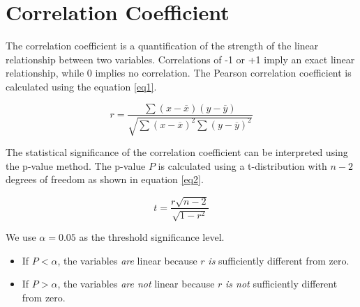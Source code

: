 \documentclass[12pt]{article}
\begin{document}
\section*{Correlation Coefficient}
The correlation coefficient is a quantification of the
strength of the linear relationship between two variables.
Correlations of -1 or +1 imply an exact linear relationship,
while 0 implies no correlation.
The Pearson correlation coefficient is calculated using
the equation \ref{eq1}.

\begin{equation}\label{eq1}
	r = \frac{\sum (x - \overline{x}) (y - \overline{y})}
        {\sqrt{\sum (x - \overline{x})^2 \sum (y - \overline{y})^2}}
\end{equation}

The statistical significance of the correlation coefficient can be
interpreted using the p-value method.
The p-value $P$ is calculated using a t-distribution with
$n - 2$ degrees of freedom as shown in equation \ref{eq2}.

\begin{equation}\label{eq2}
	t = \frac{r \sqrt{n-2}}{\sqrt{1 - r^2}}
\end{equation}

We use $\alpha = 0.05$ as the threshold significance level.
\begin{itemize}
	\item If $P < \alpha$, the variables \textit{are}
	linear because $r$ \textit{is} sufficiently different from zero.
	\item If $P > \alpha$, the variables \textit{are not}
	linear because $r$ \textit{is not} sufficiently different from zero.
\end{itemize}
\end{document}
